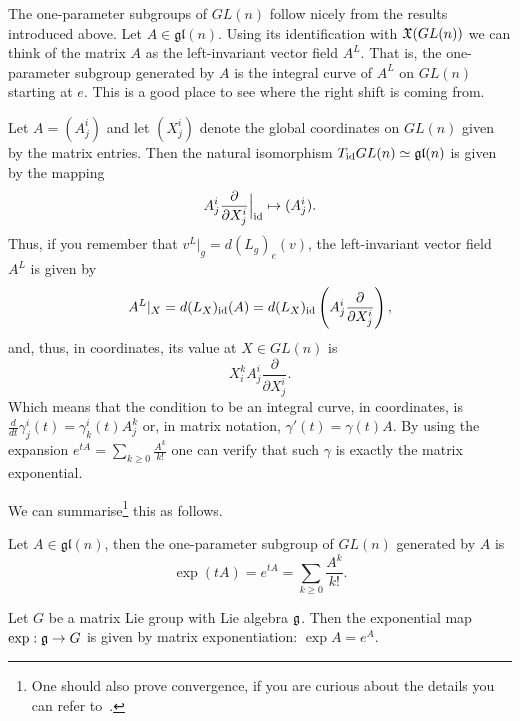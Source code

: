 The one-parameter subgroups of $GL(n)$ follow nicely from the results introduced above.
Let $A\in\mathfrak{gl}(n)$. Using its identification with $\mathfrak{X}(GL(n))$ we can think of the matrix $A$ as the left-invariant vector field $A^L$.
That is, the one-parameter subgroup generated by $A$ is the integral curve of $A^L$ on $GL(n)$ starting at $e$.
This is a good place to see where the right shift is coming from.

Let $A = (A^i_j)$ and let $(X^i_j)$ denote the global coordinates on $GL(n)$ given by the matrix entries.
Then the natural isomorphism $T_{\operatorname{id}}GL(n) \simeq \mathfrak{gl}(n)$ is given by the mapping
\begin{equation}
	A^i_j \frac{\partial }{\partial X^i_j}\Big|_{\operatorname{id}} \mapsto (A^i_j).
\end{equation}
Thus, if you remember that $v^L|_g = d(L_g)_e(v)$, the left-invariant vector field $A^L$ is given by
\begin{equation}
	A^L|_X = d(L_X)_{\operatorname{id}}(A) = d(L_X)_{\operatorname{id}}\left(A^i_j \frac{\partial }{\partial X^i_j}\right),
\end{equation}
and, thus, in coordinates, its value at $X\in GL(n)$ is
\begin{equation}
	X^k_i A^i_j \frac{\partial }{\partial X^i_j}.
\end{equation}
Which means that the condition to be an integral curve, in coordinates, is $\frac{d}{dt}\gamma^i_j(t) = \gamma^i_k(t) A^k_j$ or, in matrix notation, $\gamma'(t) = \gamma(t) A$.
By using the expansion $e^{tA} = \sum_{k\geq 0} \frac{A^k}{k!}$ one can verify that such $\gamma$ is exactly the matrix exponential.

We can summarise\footnote{One should also prove convergence, if you are curious about the details you can refer to~\cite[Proposition 20.2]{book:lee}.} this as follows.

\begin{proposition}\label{prop:expmat}
	Let $A\in\mathfrak{gl}(n)$, then the one-parameter subgroup of $GL(n)$ generated by $A$ is
	\begin{equation}
		\exp(tA) = e^{tA} = \sum_{k\geq 0} \frac{A^k}{k!}.
	\end{equation}
\end{proposition}

\begin{corollary}
	Let $G$ be a matrix Lie group with Lie algebra $\mathfrak{g}$.
	Then the exponential map $\exp:\mathfrak{g}\to G$ is given by matrix exponentiation: $\exp A = e^A$.
\end{corollary}

